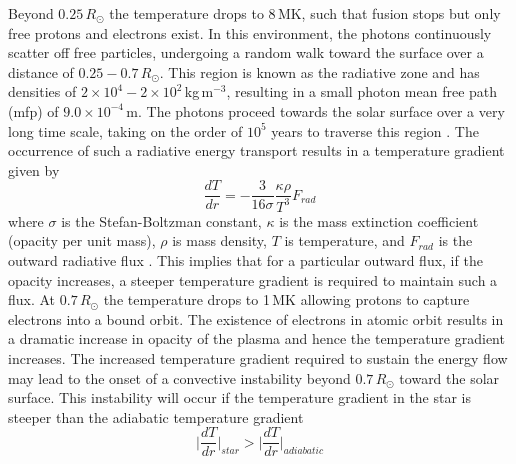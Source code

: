 Beyond $0.25\,R_{\odot}$ the temperature drops to 8\,MK, such that fusion stops but only free protons and electrons exist. In this environment, the photons continuously scatter off free particles, undergoing a random walk toward the surface over a distance of $0.25-0.7\,R_{\odot}$. This region is known as the radiative zone and has densities of $2\times10^4-2\times10^2$\,kg\,m$^{-3}$, resulting in a small photon mean free path (mfp) of $9.0\times10^{-4}$\,m. The photons proceed towards the solar surface over a very long time scale, taking on the order of $10^{5}$ years to traverse this region \citep{mitalas1992}. The occurrence of such a radiative energy transport results in a temperature gradient given by 
\begin{equation}
\frac{dT}{dr} = -\frac{3}{16 \sigma}\frac{\kappa \rho}{T^3}F_{rad}
\end{equation}
where $\sigma$ is the Stefan-Boltzman constant, $\kappa$ is the mass extinction coefficient (opacity per unit mass), $\rho$ is mass density, $T$ is temperature, and $F_{rad}$ is the outward radiative flux \citep{foukal2004}. This implies that for a particular outward flux, if the opacity increases, a steeper temperature gradient is required to maintain such a flux. At $0.7\,R_{\odot}$ the temperature drops to 1\,MK allowing protons to capture electrons into a bound orbit. The existence of electrons in atomic orbit results in a dramatic increase in opacity of the plasma \citep{turk2011} and hence the temperature gradient increases. The increased temperature gradient required to sustain the energy flow may lead to the onset of a convective instability beyond $0.7\,R_{\odot}$ toward the solar surface. This instability will occur if the temperature gradient in the star is steeper than the adiabatic temperature gradient 
\begin{equation}
\Bigg|\frac{dT}{dr}\Bigg|_{star} > \Bigg|\frac{dT}{dr}\Bigg|_{adiabatic}
\end{equation}
